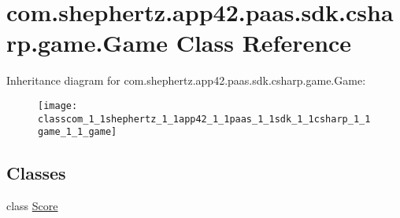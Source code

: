 \hypertarget{classcom_1_1shephertz_1_1app42_1_1paas_1_1sdk_1_1csharp_1_1game_1_1_game}{\section{com.\+shephertz.\+app42.\+paas.\+sdk.\+csharp.\+game.\+Game Class Reference}
\label{classcom_1_1shephertz_1_1app42_1_1paas_1_1sdk_1_1csharp_1_1game_1_1_game}
}
Inheritance diagram for com.\+shephertz.\+app42.\+paas.\+sdk.\+csharp.\+game.\+Game\+:\begin{figure}[H]
\begin{center}
\leavevmode
\texttt{[image: classcom\_1\_1shephertz\_1\_1app42\_1\_1paas\_1\_1sdk\_1\_1csharp\_1\_1game\_1\_1\_game]}
\end{center}
\end{figure}
\subsection*{Classes}
\begin{DoxyCompactItemize}
\item 
class \hyperlink{classcom_1_1shephertz_1_1app42_1_1paas_1_1sdk_1_1csharp_1_1game_1_1_game_1_1_score}{Score}
\end{DoxyCompactItemize}
